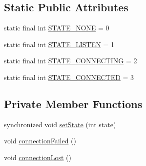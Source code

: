 \subsection*{Static Public Attributes}
\begin{DoxyCompactItemize}
\item 
static final int \hyperlink{classcom_1_1example_1_1android_1_1_bluetooth_chat_1_1_bluetooth_chat_service_acca6c8882253f023c0c4a78c76e07a5d}{S\-T\-A\-T\-E\-\_\-\-N\-O\-N\-E} = 0
\item 
static final int \hyperlink{classcom_1_1example_1_1android_1_1_bluetooth_chat_1_1_bluetooth_chat_service_a5b119ac8b511b1ccc522ad84810097fd}{S\-T\-A\-T\-E\-\_\-\-L\-I\-S\-T\-E\-N} = 1
\item 
static final int \hyperlink{classcom_1_1example_1_1android_1_1_bluetooth_chat_1_1_bluetooth_chat_service_a3f330f5177bb8c94ae6c8796c4839e0c}{S\-T\-A\-T\-E\-\_\-\-C\-O\-N\-N\-E\-C\-T\-I\-N\-G} = 2
\item 
static final int \hyperlink{classcom_1_1example_1_1android_1_1_bluetooth_chat_1_1_bluetooth_chat_service_a65bee812daa1c06904d2bfc9b6c98607}{S\-T\-A\-T\-E\-\_\-\-C\-O\-N\-N\-E\-C\-T\-E\-D} = 3
\end{DoxyCompactItemize}
\subsection*{Private Member Functions}
\begin{DoxyCompactItemize}
\item 
synchronized void \hyperlink{classcom_1_1example_1_1android_1_1_bluetooth_chat_1_1_bluetooth_chat_service_a09b77b92fc6c880860a3dbf4ab21e36c}{set\-State} (int state)
\item 
void \hyperlink{classcom_1_1example_1_1android_1_1_bluetooth_chat_1_1_bluetooth_chat_service_a784e1d9992765b96eb29e9ba63ad8902}{connection\-Failed} ()
\item 
void \hyperlink{classcom_1_1example_1_1android_1_1_bluetooth_chat_1_1_bluetooth_chat_service_abd4a195467743d2b3642bde9c5d2e0f6}{connection\-Lost} ()
\end{DoxyCompactItemize}
